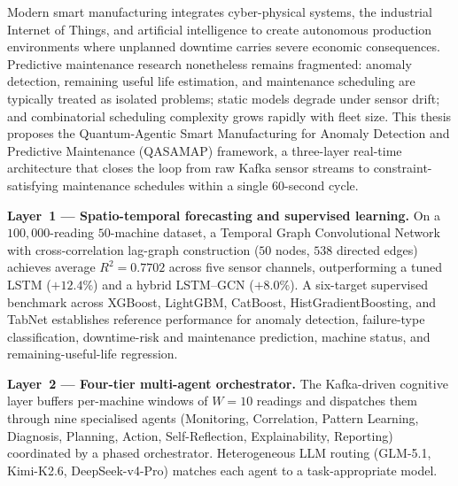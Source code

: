 Modern smart manufacturing integrates cyber-physical systems, the industrial Internet of Things, and artificial intelligence to create autonomous production environments where unplanned downtime carries severe economic consequences. Predictive maintenance research nonetheless remains fragmented: anomaly detection, remaining useful life estimation, and maintenance scheduling are typically treated as isolated problems; static models degrade under sensor drift; and combinatorial scheduling complexity grows rapidly with fleet size. This thesis proposes the Quantum-Agentic Smart Manufacturing for Anomaly Detection and Predictive Maintenance (QASAMAP) framework, a three-layer real-time architecture that closes the loop from raw Kafka sensor streams to constraint-satisfying maintenance schedules within a single $60$-second cycle.

\textbf{Layer~1 --- Spatio-temporal forecasting and supervised learning.} On a $100{,}000$-reading $50$-machine dataset, a Temporal Graph Convolutional Network with cross-correlation lag-graph construction ($50$ nodes, $538$ directed edges) achieves average $R^2 = 0.7702$ across five sensor channels, outperforming a tuned LSTM ($+12.4\%$) and a hybrid LSTM--GCN ($+8.0\%$). A six-target supervised benchmark across XGBoost, LightGBM, CatBoost, HistGradientBoosting, and TabNet establishes reference performance for anomaly detection, failure-type classification, downtime-risk and maintenance prediction, machine status, and remaining-useful-life regression.

\textbf{Layer~2 --- Four-tier multi-agent orchestrator.} The Kafka-driven cognitive layer buffers per-machine windows of $W=10$ readings and dispatches them through nine specialised agents (Monitoring, Correlation, Pattern Learning, Diagnosis, Planning, Action, Self-Reflection, Explainability, Reporting) coordinated by a phased orchestrator. Heterogeneous LLM routing (GLM-5.1, Kimi-K2.6, DeepSeek-v4-Pro) matches each agent to a task-appropriate model.

